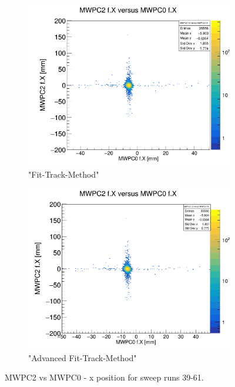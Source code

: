 \documentclass[12pt, letterpaper]{article}
\begin{document}
\begin{figure}[!htbp]
\begin{subfigure}{.5\textwidth}
\end{subfigure}
\begin{subfigure}{.5\textwidth}
  \centering
  \includegraphics[width=.9\linewidth]{plot_imgs/mw2_mw0_fit.png} 
  \caption{"Fit-Track-Method"}
  \label{fig:sub-second}
\end{subfigure}
\begin{subfigure}{.5\textwidth}
  \centering
  \includegraphics[width=.9\linewidth]{plot_imgs/mw2_mw0_last.png} 
  \caption{"Advanced Fit-Track-Method"}
  \label{fig:sub-second}
\end{subfigure}
\caption{MWPC2 vs MWPC0 - x position for sweep runs 39-61.}
\label{fig:fig}
\end{figure}
\FloatBarrier
\clearpage
\end{document}
